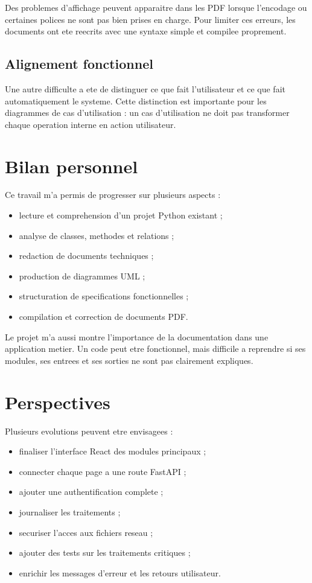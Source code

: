 \documentclass[11pt,a4paper]{report}
\begin{document}
Des problemes d'affichage peuvent apparaitre dans les PDF lorsque l'encodage ou certaines polices ne sont pas bien prises en charge. Pour limiter ces erreurs, les documents ont ete reecrits avec une syntaxe simple et compilee proprement.

\section{Alignement fonctionnel}

Une autre difficulte a ete de distinguer ce que fait l'utilisateur et ce que fait automatiquement le systeme. Cette distinction est importante pour les diagrammes de cas d'utilisation : un cas d'utilisation ne doit pas transformer chaque operation interne en action utilisateur.

\chapter{Bilan personnel}

Ce travail m'a permis de progresser sur plusieurs aspects :

\begin{itemize}
  \item lecture et comprehension d'un projet Python existant ;
  \item analyse de classes, methodes et relations ;
  \item redaction de documents techniques ;
  \item production de diagrammes UML ;
  \item structuration de specifications fonctionnelles ;
  \item compilation et correction de documents PDF.
\end{itemize}

Le projet m'a aussi montre l'importance de la documentation dans une application metier. Un code peut etre fonctionnel, mais difficile a reprendre si ses modules, ses entrees et ses sorties ne sont pas clairement expliques.

\chapter{Perspectives}

Plusieurs evolutions peuvent etre envisagees :

\begin{itemize}
  \item finaliser l'interface React des modules principaux ;
  \item connecter chaque page a une route FastAPI ;
  \item ajouter une authentification complete ;
  \item journaliser les traitements ;
  \item securiser l'acces aux fichiers reseau ;
  \item ajouter des tests sur les traitements critiques ;
  \item enrichir les messages d'erreur et les retours utilisateur.
\end{itemize}
\end{document}
